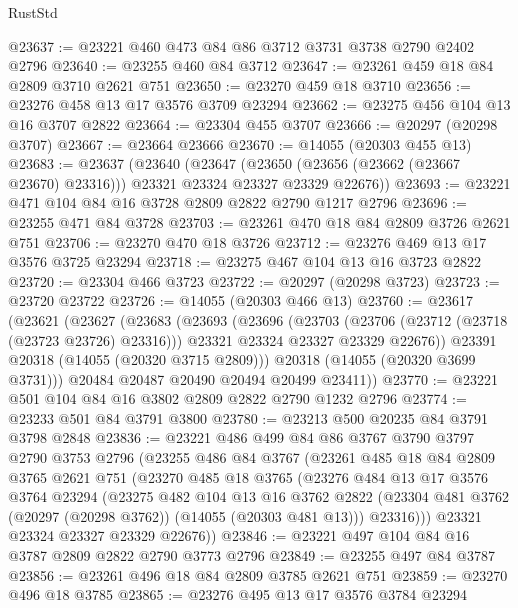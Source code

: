 \begin{lexlean}{RustStd}
\begin{coremodule}
@23637 := @23221 @460 @473 @84 @86 @3712 @3731 @3738 @2790 @2402 @2796
@23640 := @23255 @460 @84 @3712
@23647 := @23261 @459 @18 @84 @2809 @3710 @2621 @751
@23650 := @23270 @459 @18 @3710
@23656 := @23276 @458 @13 @17 @3576 @3709 @23294
@23662 := @23275 @456 @104 @13 @16 @3707 @2822
@23664 := @23304 @455 @3707
@23666 := @20297 (@20298 @3707)
@23667 := @23664 @23666
@23670 := @14055 (@20303 @455 @13)
@23683 := @23637
    (@23640
      (@23647 (@23650 (@23656 (@23662 (@23667 @23670) @23316))) @23321 @23324 @23327 @23329 @22676))
@23693 := @23221 @471 @104 @84 @16 @3728 @2809 @2822 @2790 @1217 @2796
@23696 := @23255 @471 @84 @3728
@23703 := @23261 @470 @18 @84 @2809 @3726 @2621 @751
@23706 := @23270 @470 @18 @3726
@23712 := @23276 @469 @13 @17 @3576 @3725 @23294
@23718 := @23275 @467 @104 @13 @16 @3723 @2822
@23720 := @23304 @466 @3723
@23722 := @20297 (@20298 @3723)
@23723 := @23720 @23722
@23726 := @14055 (@20303 @466 @13)
@23760 := @23617
    (@23621
      (@23627
        (@23683
          (@23693
            (@23696
              (@23703
                (@23706 (@23712 (@23718 (@23723 @23726) @23316)))
                @23321
                @23324
                @23327
                @23329
                @22676))
            @23391
            @20318
            (@14055 (@20320 @3715 @2809)))
          @20318
          (@14055 (@20320 @3699 @3731)))
        @20484
        @20487
        @20490
        @20494
        @20499
        @23411))
@23770 := @23221 @501 @104 @84 @16 @3802 @2809 @2822 @2790 @1232 @2796
@23774 := @23233 @501 @84 @3791 @3800
@23780 := @23213 @500 @20235 @84 @3791 @3798 @2848
@23836 := @23221
    @486
    @499
    @84
    @86
    @3767
    @3790
    @3797
    @2790
    @3753
    @2796
    (@23255
      @486
      @84
      @3767
      (@23261
        @485
        @18
        @84
        @2809
        @3765
        @2621
        @751
        (@23270
          @485
          @18
          @3765
          (@23276
            @484
            @13
            @17
            @3576
            @3764
            @23294
            (@23275
              @482
              @104
              @13
              @16
              @3762
              @2822
              (@23304 @481 @3762 (@20297 (@20298 @3762)) (@14055 (@20303 @481 @13)))
              @23316)))
        @23321
        @23324
        @23327
        @23329
        @22676))
@23846 := @23221 @497 @104 @84 @16 @3787 @2809 @2822 @2790 @3773 @2796
@23849 := @23255 @497 @84 @3787
@23856 := @23261 @496 @18 @84 @2809 @3785 @2621 @751
@23859 := @23270 @496 @18 @3785
@23865 := @23276 @495 @13 @17 @3576 @3784 @23294

\end{coremodule}
\end{lexlean}
